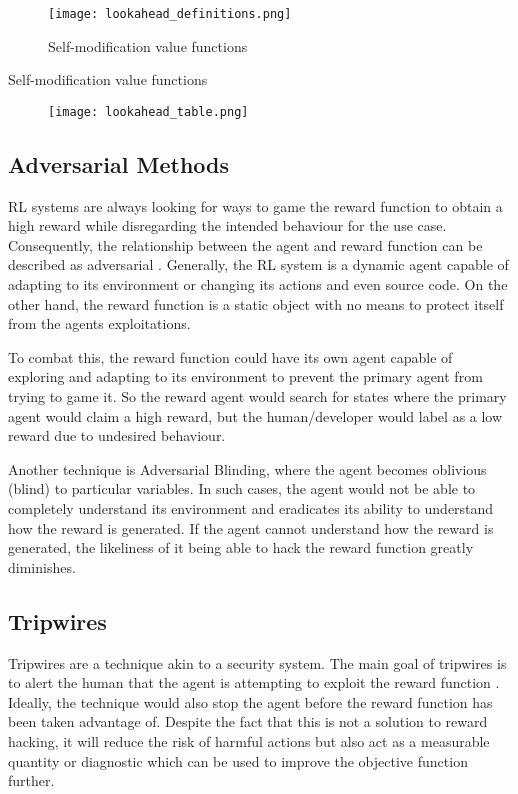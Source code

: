 \begin{figure}[H]
    \centering
    \caption{Self-modification value functions \cite{EverittFDH16}}
    \texttt{[image: lookahead\_definitions.png]}
    \label{fig:value_func}
\end{figure}

\begin{table}[h]
    \bigskip
    \caption{Self-modification value functions \cite{EverittFDH16}}
    \begin{figure}[H]
        \centering
        \texttt{[image: lookahead\_table.png]}
    \end{figure}
    \label{table:val_func_table}
\end{table}

\subsection{Adversarial Methods}
RL systems are always looking for ways to game the reward function to obtain a high reward while disregarding the intended behaviour for the use case.
Consequently, the relationship between the agent and reward function can be described as adversarial \cite{Amodei}.
Generally, the RL system is a dynamic agent capable of adapting to its environment or changing its actions and even source code. 
On the other hand, the reward function is a static object with no means to protect itself from the agents exploitations.

To combat this, the reward function could have its own agent capable of exploring and adapting to its environment to prevent the primary agent from trying to game it.
So the reward agent would search for states where the primary agent would claim a high reward, but the human/developer would label as a low reward due to undesired behaviour.

Another technique is Adversarial Blinding, where the agent becomes oblivious (blind) to particular variables.
In such cases, the agent would not be able to completely understand its environment and eradicates its ability to understand how the reward is generated.
If the agent cannot understand how the reward is generated, the likeliness of it being able to hack the reward function greatly diminishes.

\subsection{Tripwires}
Tripwires are a technique akin to a security system. The main goal of tripwires is to alert the human that the agent is attempting to exploit the reward function \cite{Amodei}.
Ideally, the technique would also stop the agent before the reward function has been taken advantage of.
Despite the fact that this is not a solution to reward hacking, it will reduce the risk of harmful actions but also act as a measurable quantity or diagnostic which can be used to improve the objective function further.

